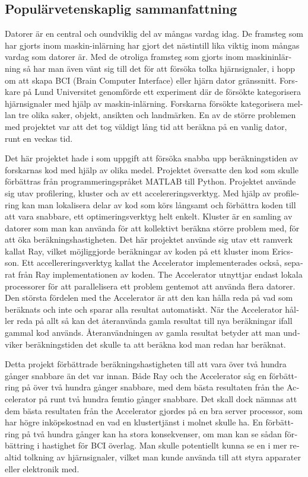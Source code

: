 \documentclass[12pt, a4paper]{article}
\begin{document}
\begin{otherlanguage}{swedish}
\section*{Populärvetenskaplig sammanfattning}
Datorer är en central och oundviklig del av mångas vardag idag.
De framsteg som har gjorts inom maskin-inlärning har gjort det nästintill lika viktig inom mångas vardag som datorer är.
Med de otroliga framsteg som gjorts inom maskininlärning så har man även vänt sig till det för att försöka tolka hjärnsignaler, i hopp om att skapa BCI (Brain Computer Interface) eller hjärn dator gränssnitt.
Forskare på Lund Universitet genomförde ett experiment där de försökte kategorisera hjärnsignaler med hjälp av maskin-inlärning.
Forskarna försökte kategorisera mellan tre olika saker, objekt, ansikten och landmärken.
En av de större problemen med projektet var att det tog väldigt lång tid att beräkna på en vanlig dator, runt en veckas tid.

Det här projektet hade i som uppgift att försöka snabba upp beräkningstiden av forskarnas kod med hjälp av olika medel.
Projektet översatte den kod som skulle förbättras från programmeringspråket MATLAB till Python.
Projektet använde sig utav profilering, kluster och av ett accelereringsverktyg.
Med hjälp av profilering kan man lokalisera delar av kod som körs långsamt och förbättra koden till att vara snabbare, ett optimeringsverktyg helt enkelt.
Kluster är en samling av datorer som man kan använda för att kollektivt beräkna större problem med, för att öka beräkningshastigheten.
Det här projektet använde sig utav ett ramverk kallat Ray, vilket möjliggjorde beräkningar av koden på ett kluster inom Ericsson.
Ett accellereringsverktyg kallat the Accelerator implementerades också, separat från Ray implementationen av koden.
The Accelerator utnyttjar endast lokala processorer för att parallelisera ett problem gentemot att använda flera datorer.
Den största fördelen med the Accelerator är att den kan hålla reda på vad som beräknats och inte och sparar alla resultat automatiskt.
När the Accelerator håller reda på allt så kan det återanvända gamla resultat till nya beräkningar ifall gammal kod används.
Återanvändningen av gamla resultat betyder att man undviker beräkningstiden det skulle ta att beräkna kod man redan har beräknat.

Detta projekt förbättrade beräkningshastigheten till att vara över två hundra gånger snabbare än det var innan.
Både Ray och the Accelerator såg en förbättring på över två hundra gånger snabbare, med dem bästa resultaten från the Accelerator på runt två hundra femtio gånger snabbare.
Det skall dock nämnas att dem bästa resultaten från the Accelerator gjordes på en bra server processor, som har högre inköpskostnad en vad en klustertjänst i molnet skulle ha.
En förbättring på två hundra gånger kan ha stora konsekvenser, om man kan se sådan förbättring i hastighet för BCI överlag.
Man skulle potentiellt kunna se en i mer realtid tolkning av hjärnsignaler, vilket man kunde använda till att styra apparater eller elektronik med.


\end{otherlanguage}
\end{document}
